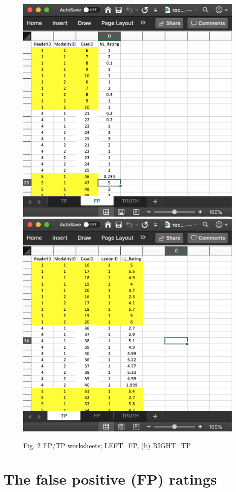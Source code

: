 \documentclass[
]{book}
\begin{document}
\begin{figure}

{\centering \includegraphics[width=0.5\linewidth,height=0.2\textheight]{images/rocSpFp} \includegraphics[width=0.5\linewidth,height=0.2\textheight]{images/rocSpTp} 

}

\caption{Fig. 2 FP/TP worksheets; LEFT=FP, (b) RIGHT=TP}\label{fig:unnamed-chunk-9}
\end{figure}

\hypertarget{the-false-positive-fp-ratings-2}{%
\section{The false positive (FP) ratings}\label{the-false-positive-fp-ratings-2}}
\end{document}
